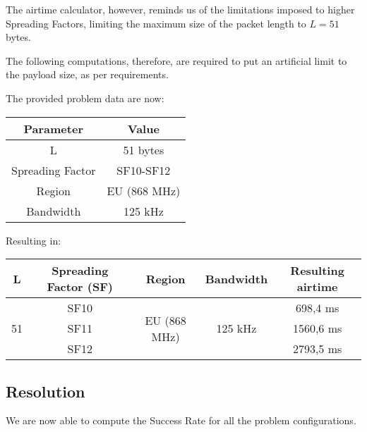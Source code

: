\documentclass[a4paper,11pt]{article} %
\begin{document}
    \bigskip

    \label{limit-sf}

    The airtime calculator, however, reminds us of the limitations imposed to higher Spreading Factors, limiting the maximum size of the packet length to $L = 51$ bytes.

    \smallskip

    The following computations, therefore, are required to put an artificial limit to the payload size, as per requirements.

    \smallskip

    The provided problem data are now:

    \medskip

    \begin{tabular}{|c|c|}
        \hline
        Parameter        & Value        \\
        \hline
        L                & 51 bytes     \\
        \hline
        Spreading Factor & SF10-SF12    \\
        \hline
        Region           & EU (868 MHz) \\
        \hline
        Bandwidth        & 125 kHz      \\
        \hline
    \end{tabular}

    \bigskip

    Resulting in:

    \medskip

    \begin{tabular}{|c|c|c|c|c|}
        \hline
        L                   & Spreading Factor (SF) & Region                        & Bandwidth                & Resulting airtime \\
        \hline
        \multirow{3}{*}{51} & SF10                  & \multirow{3}{*}{EU (868 MHz)} & \multirow{3}{*}{125 kHz} & 698,4 ms          \\
        \cline{2-2} \cline{5-5}
        & SF11                  &                               &                          & 1560,6 ms         \\
        \cline{2-2} \cline{5-5}
        & SF12                  &                               &                          & 2793,5 ms         \\
        \hline
    \end{tabular}

    \subsection{Resolution}\label{subsec:resolution}
    We are now able to compute the Success Rate for all the problem configurations.
\end{document}
